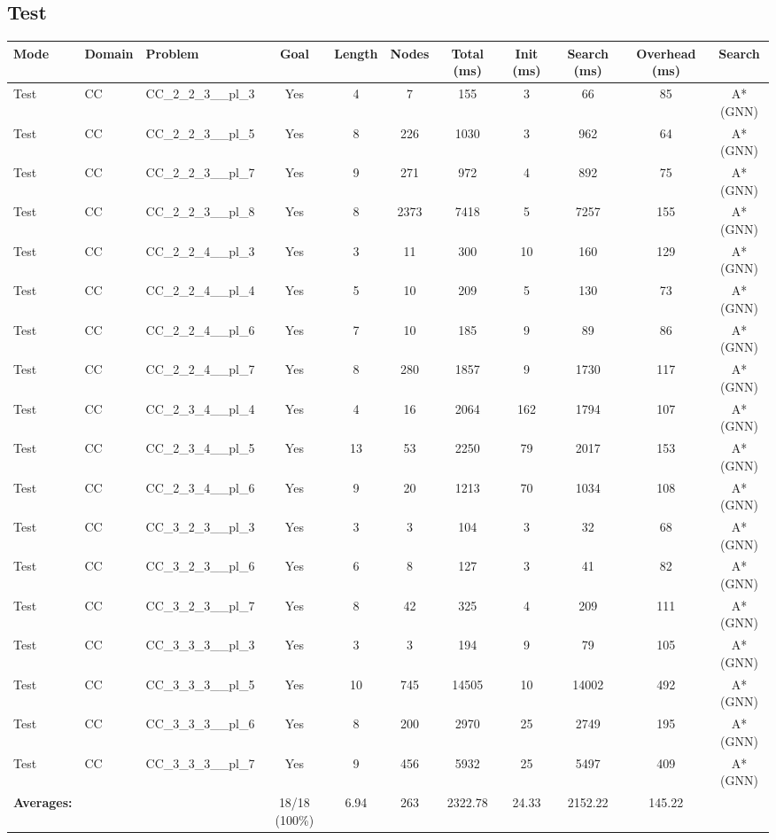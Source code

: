 \documentclass{article}
\begin{document}
\subsection*{Test}
\begin{tabular}{lllcccccccc}
\toprule
Mode & Domain & Problem & Goal & Length & Nodes & Total (ms) & Init (ms) & Search (ms) & Overhead (ms) & Search \\
\midrule
Test & CC & CC\_2\_2\_3\_\_pl\_3 & Yes & 4 & 7 & 155 & 3 & 66 & 85 & A*(GNN) \\
Test & CC & CC\_2\_2\_3\_\_pl\_5 & Yes & 8 & 226 & 1030 & 3 & 962 & 64 & A*(GNN) \\
Test & CC & CC\_2\_2\_3\_\_pl\_7 & Yes & 9 & 271 & 972 & 4 & 892 & 75 & A*(GNN) \\
Test & CC & CC\_2\_2\_3\_\_pl\_8 & Yes & 8 & 2373 & 7418 & 5 & 7257 & 155 & A*(GNN) \\
Test & CC & CC\_2\_2\_4\_\_pl\_3 & Yes & 3 & 11 & 300 & 10 & 160 & 129 & A*(GNN) \\
Test & CC & CC\_2\_2\_4\_\_pl\_4 & Yes & 5 & 10 & 209 & 5 & 130 & 73 & A*(GNN) \\
Test & CC & CC\_2\_2\_4\_\_pl\_6 & Yes & 7 & 10 & 185 & 9 & 89 & 86 & A*(GNN) \\
Test & CC & CC\_2\_2\_4\_\_pl\_7 & Yes & 8 & 280 & 1857 & 9 & 1730 & 117 & A*(GNN) \\
Test & CC & CC\_2\_3\_4\_\_pl\_4 & Yes & 4 & 16 & 2064 & 162 & 1794 & 107 & A*(GNN) \\
Test & CC & CC\_2\_3\_4\_\_pl\_5 & Yes & 13 & 53 & 2250 & 79 & 2017 & 153 & A*(GNN) \\
Test & CC & CC\_2\_3\_4\_\_pl\_6 & Yes & 9 & 20 & 1213 & 70 & 1034 & 108 & A*(GNN) \\
Test & CC & CC\_3\_2\_3\_\_pl\_3 & Yes & 3 & 3 & 104 & 3 & 32 & 68 & A*(GNN) \\
Test & CC & CC\_3\_2\_3\_\_pl\_6 & Yes & 6 & 8 & 127 & 3 & 41 & 82 & A*(GNN) \\
Test & CC & CC\_3\_2\_3\_\_pl\_7 & Yes & 8 & 42 & 325 & 4 & 209 & 111 & A*(GNN) \\
Test & CC & CC\_3\_3\_3\_\_pl\_3 & Yes & 3 & 3 & 194 & 9 & 79 & 105 & A*(GNN) \\
Test & CC & CC\_3\_3\_3\_\_pl\_5 & Yes & 10 & 745 & 14505 & 10 & 14002 & 492 & A*(GNN) \\
Test & CC & CC\_3\_3\_3\_\_pl\_6 & Yes & 8 & 200 & 2970 & 25 & 2749 & 195 & A*(GNN) \\
Test & CC & CC\_3\_3\_3\_\_pl\_7 & Yes & 9 & 456 & 5932 & 25 & 5497 & 409 & A*(GNN) \\
\textbf{Averages:} & & & 18/18 (100\%) & 6.94 & 263 & 2322.78 & 24.33 & 2152.22 & 145.22 & \\
\bottomrule
\end{tabular}
\newpage
\end{document}
